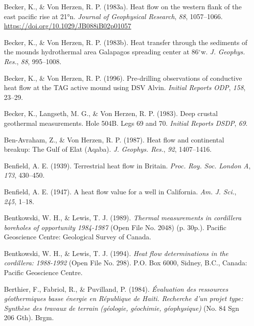 \documentclass[draft,linenumbers]{agujournal2018}
\begin{document}
\leavevmode{}%
Becker, K., \& Von Herzen, R. P. (1983a). Heat flow on the western flank
of the east pacific rise at 21°n. \emph{Journal of Geophysical
Research}, \emph{88}, 1057--1066.
\url{https://doi.org/10.1029/JB088iB02p01057}

\leavevmode{}%
Becker, K., \& Von Herzen, R. P. (1983b). Heat transfer through the
sediments of the mounds hydrothermal area {Galapagos} spreading center
at 86\(^\circ\)w. \emph{J. Geophys. Res.}, \emph{88}, 995--1008.

\leavevmode{}%
Becker, K., \& Von Herzen, R. P. (1996). Pre-drilling observations of
conductive heat flow at the TAG active mound using DSV {Alvin}.
\emph{Initial Reports ODP}, \emph{158}, 23--29.

\leavevmode{}%
Becker, K., Langseth, M. G., \& Von Herzen, R. P. (1983). Deep crustal
geothermal measurements. Hole 504B. Legs 69 and 70. \emph{Initial
Reports DSDP}, \emph{69}.

\leavevmode{}%
Ben-Avraham, Z., \& Von Herzen, R. P. (1987). Heat flow and continental
breakup: The {Gulf of Elat (Aqaba)}. \emph{J. Geophys. Res.}, \emph{92},
1407--1416.

\leavevmode{}%
Benfield, A. E. (1939). Terrestrial heat flow in {Britain}. \emph{Proc.
Roy. Soc. London A}, \emph{173}, 430--450.

\leavevmode{}%
Benfield, A. E. (1947). A heat flow value for a well in {California}.
\emph{Am. J. Sci.}, \emph{245}, 1--18.

\leavevmode{}%
Bentkowski, W. H., \& Lewis, T. J. (1989). \emph{Thermal measurements in
cordillera boreholes of opportunity 1984-1987} (Open File No. 2048) (p.
30p.). Pacific Geoscience Centre: Geological Survey of Canada.

\leavevmode{}%
Bentkowski, W. H., \& Lewis, T. J. (1994). \emph{Heat flow
determinations in the cordillera: 1988-1992} (Open File No. 298). P.O.
Box 6000, Sidney, B.C., Canada: Pacific Geoscience Centre.

\leavevmode{}%
Berthier, F., Fabriol, R., \& Puvilland, P. (1984). \emph{Évaluation des
ressources géothermiques basse énergie en {République} de {Haiti}.
{Recherche} d'un projet type: Synthèse des travaux de terrain (géologie,
géochimie, géophysique)} (No. 84 Sgn 206 Gth). Brgm.
\end{document}
